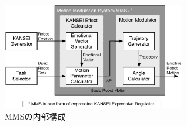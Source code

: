 \begin{figure}[b]
\centering
\includegraphics[width=8cm]{MMS.eps}
\vspace{-3mm}
\caption{MMSの内部構成}
\label{fig:mms}
\vspace{5mm}
\end{figure}

